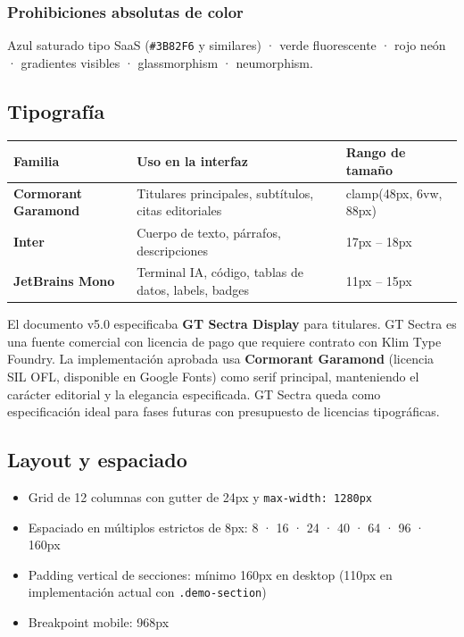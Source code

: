 \documentclass[11pt, a4paper]{article}
\begin{document}
\subsubsection{Prohibiciones absolutas de color}

Azul saturado tipo SaaS (\texttt{\#3B82F6} y similares) · verde fluorescente · rojo
neón · gradientes visibles · glassmorphism · neumorphism.

\subsection{Tipografía}

\begin{table}[h]
\centering
\begin{tabularx}{\linewidth}{>{\bfseries}l X >{\small}l}
\toprule
Familia & Uso en la interfaz & Rango de tamaño \\
\midrule
Cormorant Garamond & Titulares principales, subtítulos, citas editoriales &
  clamp(48px, 6vw, 88px) \\
Inter & Cuerpo de texto, párrafos, descripciones &
  17px -- 18px \\
JetBrains Mono & Terminal IA, código, tablas de datos, labels, badges &
  11px -- 15px \\
\bottomrule
\end{tabularx}
\end{table}

\begin{notatec}
El documento v5.0 especificaba \textbf{GT Sectra Display} para titulares.
GT Sectra es una fuente comercial con licencia de pago que requiere contrato
con Klim Type Foundry. La implementación aprobada usa \textbf{Cormorant Garamond}
(licencia SIL OFL, disponible en Google Fonts) como serif principal, manteniendo
el carácter editorial y la elegancia especificada. GT Sectra queda como especificación
ideal para fases futuras con presupuesto de licencias tipográficas.
\end{notatec}

\subsection{Layout y espaciado}

\begin{itemize}[leftmargin=*]
  \item Grid de 12 columnas con gutter de 24px y \texttt{max-width: 1280px}
  \item Espaciado en múltiplos estrictos de 8px: 8 · 16 · 24 · 40 · 64 · 96 · 160px
  \item Padding vertical de secciones: mínimo 160px en desktop (110px en implementación actual con \texttt{.demo-section})
  \item Breakpoint mobile: 968px
\end{itemize}
\end{document}
